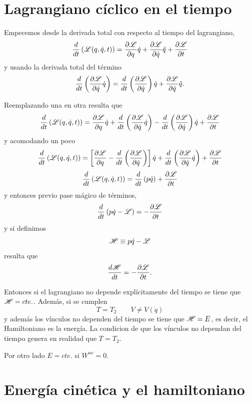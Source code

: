 \documentclass[10pt,oneside]{CBFT_book}
\begin{document}
\section{Lagrangiano cíclico en el tiempo}

Empecemos desde la derivada total con respecto al tiempo del lagrangiano,
\[
	\frac{d}{dt}\left( \Lag( q, \dot{q}, t)\right) =
	\dpar{\Lag}{q} \dot{q} + \dpar{\Lag}{\dot{q}} \ddot{q} + \dpar{\Lag}{t}
\]
y usando la derivada total del término 
\[
	\frac{d}{dt}\left( \dpar{\Lag}{\dot{q}}\dot{q}\right) =
	\frac{d}{dt}\left( \dpar{\Lag}{\dot{q}} \right) \dot{q} + \dpar{\Lag}{\dot{q}} \ddot{q} .
\]

Reemplazando una en otra resulta que 
\[
	\frac{d}{dt}\left( \Lag( q, \dot{q}, t)\right) = \dpar{\Lag}{q} \dot{q} + \frac{d}{dt}\left( 
	\dpar{\Lag}{\dot{q}}\dot{q}\right) - \frac{d}{dt}\left( \dpar{\Lag}{\dot{q}} \right) \dot{q} + \dpar{\Lag}{t}
\]
y acomodando un poco
\[
	\frac{d}{dt}\left( \Lag( q, \dot{q}, t)\right) = 
	\left[ \dpar{\Lag}{q}  - \frac{d}{dt}\left( \dpar{\Lag}{\dot{q}} \right) \right] \dot{q} + 
	\frac{d}{dt}\left( \dpar{\Lag}{\dot{q}}\dot{q}\right)  + \dpar{\Lag}{t}
\]
\[
	\frac{d}{dt}\left( \Lag( q, \dot{q}, t)\right) = \frac{d}{dt}\left( p \dot{q} \right) + \dpar{\Lag}{t}
\]
y entonces previo pase mágico de términos,
\[
	\frac{d}{dt}\left( p\dot{q} - \Lag \right) = -\dpar{\Lag}{t}
\]
y si definimos
\[
	\Ham \equiv p\dot{q} - \Lag 
\]
resulta que 
\[
	\dtot{\Ham}{t} = - \dpar{\Lag}{t}.
\]

Entonces si el lagrangiano no depende explícitamente del tiempo se tiene que $\Ham = cte.$. Además,
si se cumplen 
\[
	T=T_2 \qquad V \neq V(\dot{q})
\]
y además los vínculos no dependen del tiempo se tiene que $\Ham=E$, es decir, el Hamiltoniano es la
energía. La condicion de que los vínculos no dependan del tiempo genera en realidad que $T=T_2$.

Por otro lado $E = cte.$ si $W^{nc} = 0$.

\section{Energía cinética y el hamiltoniano}
\end{document}
